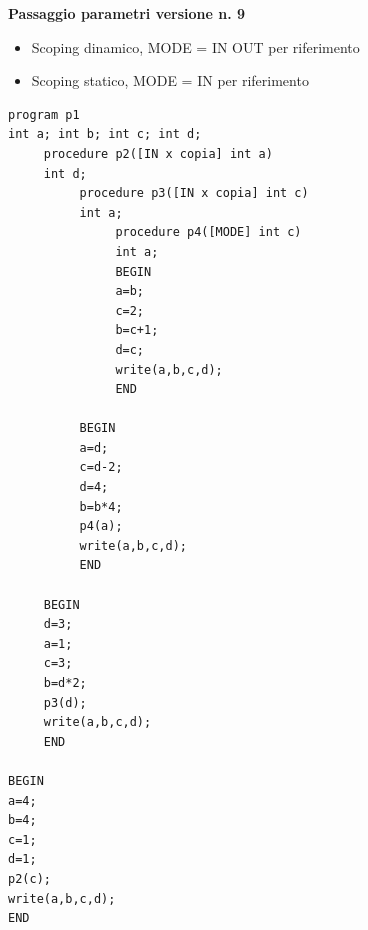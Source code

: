 \documentclass{article}
\begin{document}
\noindent
{\bf Passaggio parametri versione n. 9}\vspace*{-1pt}
\begin{itemize}
\item Scoping dinamico, MODE = IN OUT per riferimento
\item Scoping statico, MODE = IN per riferimento
\end{itemize}

\begin{verbatim}
program p1
int a; int b; int c; int d; 
     procedure p2([IN x copia] int a)
     int d; 
          procedure p3([IN x copia] int c)
          int a; 
               procedure p4([MODE] int c)
               int a; 
               BEGIN
               a=b;
               c=2;
               b=c+1;
               d=c;
               write(a,b,c,d);
               END

          BEGIN
          a=d;
          c=d-2;
          d=4;
          b=b*4;
          p4(a);
          write(a,b,c,d);
          END

     BEGIN
     d=3;
     a=1;
     c=3;
     b=d*2;
     p3(d);
     write(a,b,c,d);
     END

BEGIN
a=4;
b=4;
c=1;
d=1;
p2(c);
write(a,b,c,d);
END


\end{verbatim}
\newpage
\end{document}
